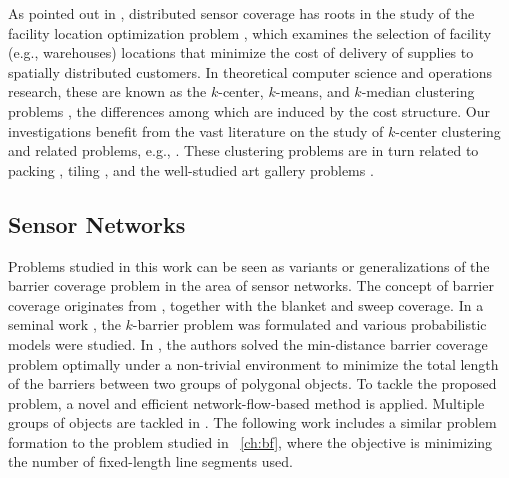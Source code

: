 As pointed out in \cite{cortes2004coverage,schwager2009decentralized}, 
distributed sensor coverage has roots in the study 
of the facility location optimization problem 
\cite{weber1929theory,drezner1995facility}, which examines the selection 
of facility (e.g., warehouses) locations that minimize the cost of delivery 
of supplies to spatially distributed customers. In theoretical computer 
science and operations research, these are known as the $k$-center, 
$k$-means, and $k$-median clustering problems \cite{har2011geometric}, 
the differences among which are induced by the cost structure. Our 
investigations benefit from the vast literature on 
the study of $k$-center clustering and related problems, e.g., 
\cite{feder1988optimal,hochbaum1985best,gonzalez1985clustering,daskin2000new,shamos1975closest}.
%
These clustering problems are in turn related to packing 
\cite{hales2005proof}, tiling \cite{thue1910dichteste}, and the 
well-studied art gallery problems \cite{o1987art,shermer1992recent}.

\subsection{Sensor Networks}
Problems studied in this work can be seen as variants or generalizations of the barrier coverage problem in the area of sensor networks.
The concept of barrier coverage originates from \cite{gage1992command}, together with the blanket and sweep coverage. 
In a seminal work \cite{kumar2005barrier}, the $k$-barrier problem was formulated and various probabilistic models were studied. 
In \cite{kloder2007barrier}, the authors solved the min-distance barrier coverage problem optimally under a non-trivial environment to minimize the total length of the barriers between two groups of polygonal objects. 
To tackle the proposed problem, a novel and efficient network-flow-based method is applied. 
Multiple groups of objects are tackled in \cite{abrahamsen2020geometric}.
The following work \cite{kloder2008thesis} includes a similar problem formation to the problem studied in ~\ref{ch:bf}, where the objective is minimizing the number of fixed-length line segments used. 

